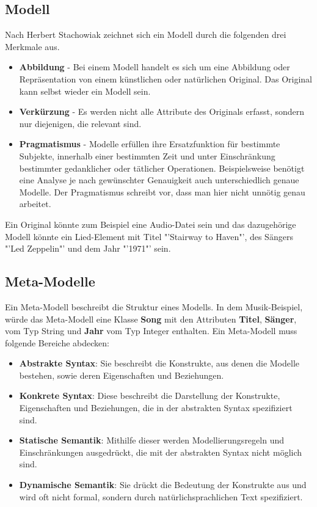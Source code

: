 \subsection{Modell}
\label{subch:Modell}
Nach Herbert Stachowiak \cite{Stachowiak1973} zeichnet sich ein Modell durch die folgenden drei Merkmale aus.
\begin{itemize}
\item \textbf{Abbildung} - Bei einem Modell handelt es sich um eine Abbildung oder Repräsentation von einem künstlichen oder natürlichen Original. Das Original kann selbst wieder ein Modell sein. 
\item \textbf{Verkürzung} - Es werden nicht alle Attribute des Originals erfasst, sondern nur diejenigen, die relevant sind.
\item \textbf{Pragmatismus} - Modelle erfüllen ihre Ersatzfunktion für bestimmte Subjekte, innerhalb einer bestimmten Zeit und unter Einschränkung bestimmter gedanklicher oder tätlicher Operationen. Beispielsweise benötigt eine Analyse je nach gewünschter Genauigkeit auch unterschiedlich genaue Modelle. Der Pragmatismus schreibt vor, dass man hier nicht unnötig genau arbeitet.
\end{itemize} 
Ein Original könnte zum Beispiel eine Audio-Datei sein und das dazugehörige Modell könnte ein Lied-Element mit Titel "'Stairway to Haven"', des Sängers "'Led Zeppelin"' und dem Jahr "'1971"' sein.

\subsection{Meta-Modelle}
Ein Meta-Modell beschreibt die Struktur eines Modells. In dem Musik-Beispiel, würde das Meta-Modell eine Klasse \textbf{Song} mit den Attributen \textbf{Titel}, \textbf{Sänger}, vom Typ String und \textbf{Jahr} vom Typ Integer enthalten.
Ein Meta-Modell muss folgende Bereiche abdecken:
\begin{itemize}
\item \textbf{Abstrakte Syntax}: Sie beschreibt die Konstrukte, aus denen die Modelle bestehen, sowie deren Eigenschaften und Beziehungen.
\item \textbf{Konkrete Syntax}: Diese beschreibt die Darstellung der Konstrukte, Eigenschaften und Beziehungen, die in der abstrakten Syntax spezifiziert sind.
\item \textbf{Statische Semantik}: Mithilfe dieser werden Modellierungsregeln und Einschränkungen ausgedrückt, die mit der abstrakten Syntax nicht möglich sind.
\item \textbf{Dynamische Semantik}: Sie drückt die Bedeutung der Konstrukte aus und wird oft nicht formal, sondern durch natürlichsprachlichen Text spezifiziert.
\end{itemize}


